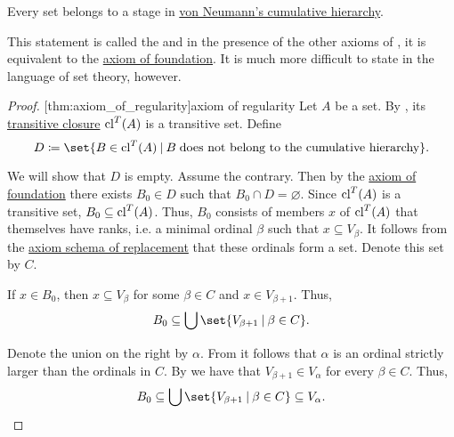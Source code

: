 \begin{theorem}\label{thm:axiom_of_regularity}
  Every set belongs to a stage in \hyperref[def:cumulative_hierarchy]{von Neumann's cumulative hierarchy}.

  This statement is called the  and in the presence of the other axioms of , it is equivalent to the \hyperref[def:zfc/foundation]{axiom of foundation}. It is much more difficult to state in the language of set theory, however.
\end{theorem}
\begin{proof}
  [thm:axiom_of_regularity]{axiom of regularity} Let \( A \) be a set. By , its \hyperref[def:transitive_closure_of_a_set]{transitive closure} \( \operatorname{cl}^T(A) \) is a transitive set. Define
  \begin{equation*}
    D \coloneqq \set{ B \in \cl^T(A) \given B \T{does not belong to the cumulative hierarchy} }.
  \end{equation*}

  We will show that \( D \) is empty. Assume the contrary. Then by the \hyperref[def:zfc/foundation]{axiom of foundation} there exists \( B_0 \in D \) such that \( B_0 \cap D = \varnothing \). Since \( \operatorname{cl}^T(A) \) is a transitive set, \( B_0 \subseteq \operatorname{cl}^T(A) \). Thus, \( B_0 \) consists of members \( x \) of \( \operatorname{cl}^T(A) \) that themselves have ranks, i.e. a minimal ordinal \( \beta \) such that \( x \subseteq V_\beta \). It follows from the \hyperref[def:zfc/replacement]{axiom schema of replacement} that these ordinals form a set. Denote this set by \( C \).

  If \( x \in B_0 \), then \( x \subseteq V_\beta \) for some \( \beta \in C \) and \( x \in V_{\beta + 1} \). Thus,
  \begin{equation*}
    B_0 \subseteq \bigcup\set{ V_{\beta + 1} \given \beta \in C }.
  \end{equation*}

  Denote the union on the right by \( \alpha \). From  it follows that \( \alpha \) is an ordinal strictly larger than the ordinals in \( C \). By  we have that \( V_{\beta + 1} \in V_\alpha \) for every \( \beta \in C \). Thus,
  \begin{equation*}
    B_0 \subseteq \bigcup\set{ V_{\beta + 1} \given \beta \in C } \subseteq V_\alpha.
  \end{equation*}


\end{proof}
